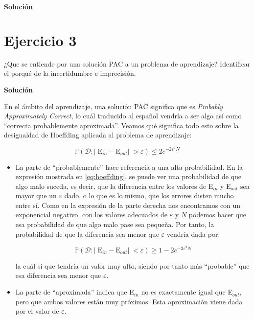 \documentclass[11pt,a4paper]{article}
\newcommand{\answer}{\noindent\textbf{Solución}}
\newcommand{\ein}{E$_{in}$}
\newcommand{\eout}{E$_{out}$}
\newcommand{\addtoc}[1]{\addcontentsline{toc}{section}{#1}}
\begin{document}
\answer

\section*{Ejercicio 3}
\addtoc{Ejercicio 3}

\noindent ¿Que se entiende por una solución PAC a un problema de aprendizaje? Identificar el porqué de la incertidumbre e
imprecisión.

\answer

En el ámbito del aprendizaje, una solución PAC significa que es \textit{Probably Approximately Correct}, 
lo cuál traducido al español vendría a ser algo así como ``correcta probablemente aproximada''.
Veamos qué significa todo esto sobre la desigualdad de Hoeffding aplicada al problema de aprendizaje:

\begin{equation}
\label{eq:hoeffding}
	\mathbb{P}(\mathcal{D}: | \; \text{E}_{in} - \text{E}_{out} | \; > \varepsilon) \leq 2e^{-2\varepsilon^2N}
\end{equation}

\begin{itemize}[label=\textbullet]
	\item  La parte de ``probablemente'' hace referencia a una alta probabilidad. En la expresión mostrada en
	\eqref{eq:hoeffding}, se puede ver una probabilidad de que algo malo suceda, es decir, que la
	diferencia 	entre los valores de \ein{} y \eout{} sea mayor que un $\varepsilon$ dado, o lo que es lo mismo, que los
	errores disten mucho entre sí. Como en la 	expresión de la parte derecha nos encontramos con un exponencial negativo,
	con los valores adecuados de $\varepsilon$ y $N$ podemos hacer que esa probabilidad de que algo malo pase sea pequeña.
	Por tanto, la probabilidad de que la diferencia sea menor que $\varepsilon$ vendría dada por:
	
	\[\mathbb{P}(\mathcal{D}: | \; \text{E}_{in} - \text{E}_{out} | \; < \varepsilon) \geq 1 - 2e^{-2\varepsilon^2N}\]
	
	\noindent la cuál sí que tendría un valor muy alto, siendo por tanto más ``probable'' que esa diferencia sea menor que
	$\varepsilon$.
	\item La parte de ``aproximada'' indica que \ein{} no es exactamente igual que \eout{}, pero que ambos valores están muy
	próximos. Esta aproximación viene dada por el valor de $\varepsilon$.
\end{itemize}
\end{document}
